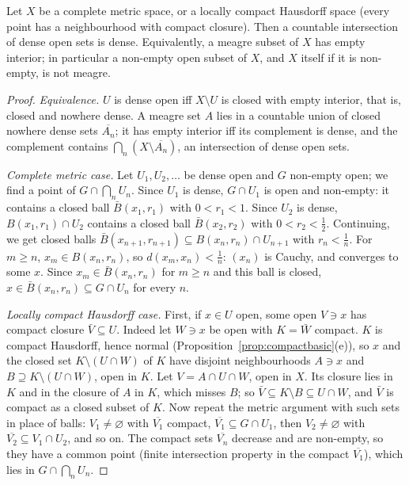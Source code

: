 \begin{theorem}[Baire, 1899]\label{thm:baire}
Let $X$ be a complete metric space, or a locally compact Hausdorff space (every point has a neighbourhood with compact closure). Then a
countable intersection of dense open sets is dense. Equivalently, a meagre subset of $X$ has empty interior; in particular a non-empty
open subset of $X$, and $X$ itself if it is non-empty, is not meagre.
\end{theorem}
\begin{proof}
\emph{Equivalence.} $U$ is dense open iff $X\setminus U$ is closed with empty interior, that is, closed and nowhere dense. A meagre set $A$ lies in a countable
union of closed nowhere dense sets $\overline{A_n}$; it has empty interior iff its complement is dense, and the complement contains $\bigcap_n(X\setminus\overline{A_n})$, an
intersection of dense open sets.

\emph{Complete metric case.} Let $U_1,U_2,\dots$ be dense open and $G$ non-empty open; we find a point of $G\cap\bigcap_nU_n$. Since $U_1$ is dense, $G\cap U_1$ is open
and non-empty: it contains a closed ball $\bar B(x_1,r_1)$ with $0<r_1<1$. Since $U_2$ is dense, $B(x_1,r_1)\cap U_2$ contains a closed ball $\bar B(x_2,r_2)$ with $0<r_2<\frac12$. Continuing,
we get closed balls $\bar B(x_{n+1},r_{n+1})\subseteq B(x_n,r_n)\cap U_{n+1}$ with $r_n<\frac1n$. For $m\ge n$, $x_m\in B(x_n,r_n)$, so $d(x_m,x_n)<\frac1n$: $(x_n)$ is Cauchy, and converges to some
$x$. Since $x_m\in\bar B(x_n,r_n)$ for $m\ge n$ and this ball is closed, $x\in\bar B(x_n,r_n)\subseteq G\cap U_n$ for every $n$.

\emph{Locally compact Hausdorff case.} First, if $x\in U$ open, some open $V\ni x$ has compact closure $\bar V\subseteq U$. Indeed let $W\ni x$ be open with $K=\bar W$ compact.
$K$ is compact Hausdorff, hence normal (Proposition~\ref{prop:compactbasic}(e)), so $x$ and the closed set $K\setminus(U\cap W)$ of $K$ have disjoint neighbourhoods
$A\ni x$ and $B\supseteq K\setminus(U\cap W)$, open in $K$. Let $V=A\cap U\cap W$, open in $X$. Its closure lies in $K$ and in the closure of $A$ in $K$, which misses $B$; so
$\bar V\subseteq K\setminus B\subseteq U\cap W$, and $\bar V$ is compact as a closed subset of $K$. Now repeat the metric argument with such sets in place of balls: $V_1\ne\varnothing$ with
$\overline{V_1}$ compact, $\overline{V_1}\subseteq G\cap U_1$, then $V_2\ne\varnothing$ with $\overline{V_2}\subseteq V_1\cap U_2$, and so on. The compact sets $\overline{V_n}$ decrease and are non-empty, so they
have a common point (finite intersection property in the compact $\overline{V_1}$), which lies in $G\cap\bigcap_nU_n$.
\end{proof}

